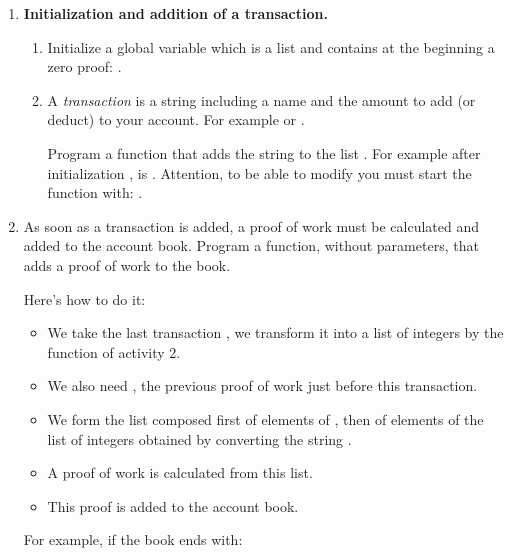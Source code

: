 \documentclass[11pt,class=report,crop=false]{standalone}
\begin{document}
\begin{activite}




\begin{enumerate}
  \item \textbf{Initialization and addition of a transaction.}
  
  \begin{enumerate}
    \item Initialize a global variable  which is a list and contains at the beginning a zero proof:  .
  
    \item A \emph{transaction} is a string including a name and the amount to add (or deduct) to your account. For example  or .
    
    Program a function  that adds the string  to the list . 
For example after initialization ,  
     is \ci{[ [0,0,0,0,0,0], "Camille +100" ]}.
    Attention, to be able to modify  you must start the function with: .
    
  \end{enumerate} 
  
   \item As soon as a transaction is added, a proof of work must be calculated and added to the account book. Program a  function, without parameters, that adds a proof of work to the book.   
   
Here's how to do it:
  \begin{itemize}
    \item We take the last transaction , we transform it into a list of integers by the function  of activity 2.
    \item We also need , the previous proof of work just before this transaction.
    \item We form the list  composed first of elements of , then of elements of the list of integers obtained by converting the string .
    \item A proof of work is calculated from this list.
    \item This proof is added to the account book.
  \end{itemize}
  For example, if the book ends with:
  

\end{enumerate}
\end{activite}
\end{document}
